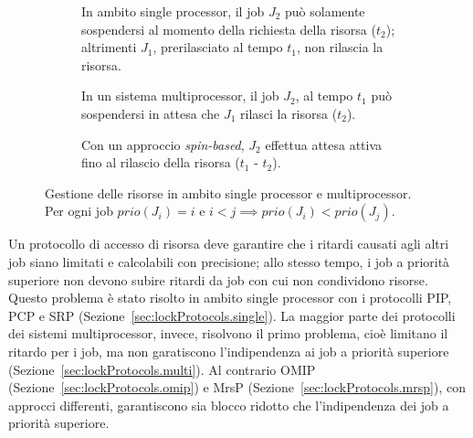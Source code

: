 \begin{figure}
    \centering
      \begin{subfigure}[b]{0.80\textwidth}
        \centering
        \resizebox{\linewidth}{!}\singleResource
        \caption{In ambito single processor, il job $J_2$ può solamente sospendersi al momento della richiesta della risorsa ($t_2$); altrimenti $J_1$, prerilasciato al tempo $t_1$, non rilascia la risorsa.}
        \label{fig:singleResource}
      \end{subfigure}
      \vspace{1cm}
      \begin{subfigure}[b]{0.70\textwidth}
        \centering
        \resizebox{\linewidth}{!}\multiSuspResource
        \caption{In un sistema multiprocessor, il job $J_2$, al tempo $t_1$ può sospendersi in attesa che $J_1$ rilasci la risorsa ($t_2$).}
        \label{fig:multiSuspResource}
      \end{subfigure}
      \vspace{1cm}
      \begin{subfigure}[b]{0.70\textwidth}
        \centering
        \resizebox{\linewidth}{!}\multiBusyWaitResource
        \caption{Con un approccio \textit{spin-based}, $J_2$ effettua attesa attiva fino al rilascio della risorsa ($t_1$ - $t_2$).}
        \label{fig:multiBusyWaitResource}
      \end{subfigure}
    \caption{Gestione delle risorse in ambito single processor e multiprocessor. Per ogni job $prio(J_i) = i$ e $i < j \implies prio(J_i) < prio(J_j)$.}
    \label{fig:solutions}
  \end{figure}


Un protocollo di accesso di risorsa deve garantire che i ritardi causati agli altri job siano limitati e calcolabili con precisione; allo stesso tempo, i job a priorità superiore non devono subire ritardi da job con cui non condividono risorse. Questo problema è stato risolto in ambito single processor con i protocolli PIP, PCP e SRP (Sezione~\ref{sec:lockProtocols.single}). La maggior parte dei protocolli dei sistemi multiprocessor, invece, risolvono il primo problema, cioè limitano il ritardo per i job, ma non garatiscono l'indipendenza ai job a priorità superiore (Sezione~\ref{sec:lockProtocols.multi}). Al contrario OMIP (Sezione~\ref{sec:lockProtocols.omip}) e MrsP (Sezione~\ref{sec:lockProtocols.mrsp}), con approcci differenti, garantiscono sia blocco ridotto che l'indipendenza dei job a priorità superiore.\\

